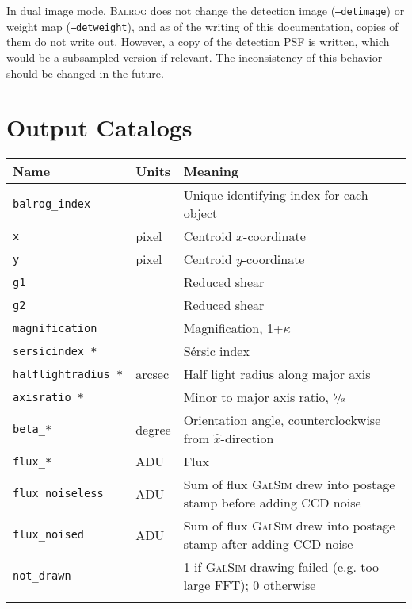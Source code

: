 \documentclass[11pt]{book}
\newcommand{\codett}[1]{\texttt{#1}}
\newcommand{\galsim}{\textsc{GalSim}}
\newcommand{\balrog}{\textsc{Balrog}}
\newcommand{\opt}[1]{\codett{--#1}}
\newcommand{\sersic}{S\'{e}rsic}
\begin{document}
In dual image mode, \balrog{} does not change the detection image (\opt{detimage}) or weight map (\opt{detweight}), and 
as of the writing of this documentation, copies of them do not write out.
However, a copy of the detection PSF is written, which would be a subsampled version if relevant.
The inconsistency of this behavior should be changed in the future. 


\section{Output Catalogs}
\label{sec:catalogs}

\begin{table}
\caption{\balrog{}'s output truth catalog.}
\label{tab:truth}
\begin{longtabu} to \textwidth {l l X}
\toprule %
{} Name & Units & Meaning \\ \midrule
\texttt{balrog\_index} &  & Unique identifying index for each object\\
\texttt{x} & pixel & Centroid $x$-coordinate\\
\texttt{y} & pixel & Centroid $y$-coordinate\\
\texttt{g1} & & Reduced shear\\
\texttt{g2} & & Reduced shear\\
\texttt{magnification} & & Magnification, 1+$\kappa$ \\
\texttt{sersicindex\_*} & & \sersic{} index \\
\texttt{halflightradius\_*} & arcsec & Half light radius along major axis\\
\texttt{axisratio\_*} & & Minor to major axis ratio, $\sfrac{b}{a}$ \\
\texttt{beta\_*} & degree & Orientation angle, counterclockwise from $\hat{x}$-direction\\
\texttt{flux\_*} & ADU & Flux\\
\texttt{flux\_noiseless} & ADU & Sum of flux \galsim{} drew into postage stamp before adding CCD noise\\
\texttt{flux\_noised} & ADU & Sum of flux \galsim{} drew into postage stamp after adding CCD noise\\
\texttt{not\_drawn} & & 1 if \galsim{} drawing failed (e.g. too large FFT); 0 otherwise \\
 & & \\

\end{longtabu}
\end{table}
\end{document}
